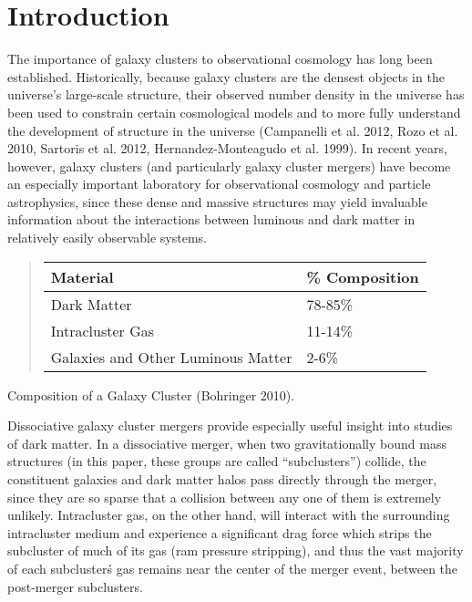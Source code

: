 \message{ !name(THESIS_LATEX_WHAT_THE_HECK.tex)}\documentclass[12 pt]{article}
\begin{document}
\section{Introduction}

The importance of galaxy clusters to observational cosmology has long been established.  Historically, because galaxy clusters are the densest objects in the universe's large-scale structure, their observed number density in the universe has been used to constrain certain cosmological models and to more fully understand the development of structure in the universe (Campanelli et al. 2012, Rozo et al. 2010, Sartoris et al. 2012, Hernandez-Monteagudo et al. 1999). In recent years, however, galaxy clusters (and particularly galaxy cluster mergers) have become an especially important laboratory for observational cosmology and particle astrophysics, since these dense and massive structures may yield invaluable information about the interactions between luminous and dark matter in relatively easily observable systems. 

\begin{quote}
\begin{tabular}{|l|l|} \hline
Material & \% Composition \\ \hline
Dark Matter & 78-85\% \\
Intracluster Gas & 11-14\% \\
Galaxies and Other Luminous Matter & 2-6\% \\
\hline
\end{tabular}
\label{tab1}
\end{quote}
Composition of a Galaxy Cluster (Bohringer 2010).

Dissociative galaxy cluster mergers provide especially useful insight into studies of dark matter. In a dissociative merger, when two gravitationally bound mass structures (in this paper, these groups are called “subclusters”) collide, the constituent galaxies and dark matter halos pass directly through the merger, since they are so sparse that a collision between any one of them is extremely unlikely. Intracluster gas, on the other hand, will interact with the surrounding intracluster medium and experience a significant drag force which strips the subcluster of much of its gas (ram pressure stripping), and thus the vast majority of each subcluster\'s gas remains near the center of the merger event, between the post-merger subclusters.
\end{document}
